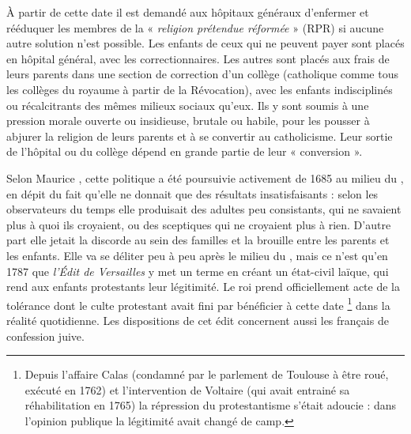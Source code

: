  À partir de cette date il est demandé aux hôpitaux généraux d'enfermer et rééduquer les membres de la « \emph{religion prétendue réformée} » (RPR) si aucune autre solution n'est possible. Les enfants de ceux qui ne peuvent payer sont placés en hôpital général, avec les correctionnaires. Les autres sont placés aux frais de leurs parents dans une section de correction d'un collège (catholique comme tous les collèges du royaume à partir de la Révocation), avec les enfants indisciplinés ou récalcitrants des mêmes milieux sociaux qu'eux. Ils y sont soumis à une pression morale ouverte ou insidieuse, brutale ou habile, pour les pousser à abjurer la religion de leurs parents et à se convertir au catholicisme. Leur sortie de l'hôpital ou du collège dépend en grande partie de leur « conversion ». 

 Selon Maurice , cette politique a été poursuivie activement de 1685 au milieu du , en dépit du fait qu'elle ne donnait que des résultats insatisfaisants : selon les observateurs du temps elle produisait des adultes peu consistants, qui ne savaient plus à quoi ils croyaient, ou des sceptiques qui ne croyaient plus à rien. D'autre part elle jetait la discorde au sein des familles et la brouille entre les parents et les enfants. Elle va se déliter peu à peu après le milieu du , mais ce n'est qu'en 1787 que \emph{l'Édit de Versailles} y met un terme en créant un état-civil laïque, qui rend aux enfants protestants leur légitimité. Le roi prend officiellement acte de la tolérance dont le culte protestant avait fini par bénéficier à cette date%
\footnote{Depuis l'affaire Calas (condamné par le parlement de Toulouse à être roué, exécuté en 1762) et l'intervention de Voltaire (qui avait entrainé sa réhabilitation en 1765) la répression du protestantisme s'était adoucie : dans l'opinion publique la légitimité avait changé de camp.} 
dans la réalité quotidienne. Les dispositions de cet édit concernent aussi les français de confession juive.



